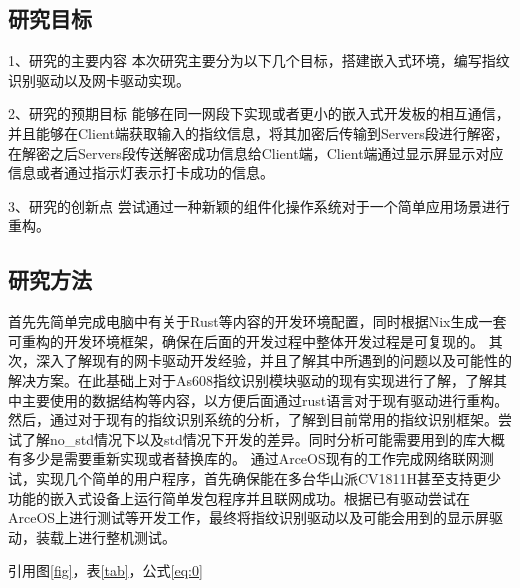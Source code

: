 
\subsection{研究目标}

1、研究的主要内容
本次研究主要分为以下几个目标，搭建嵌入式环境，编写指纹识别驱动以及网卡驱动实现。

2、研究的预期目标
能够在同一网段下实现或者更小的嵌入式开发板的相互通信，并且能够在Client端获取输入的指纹信息，将其加密后传输到Servers段进行解密，在解密之后Servers段传送解密成功信息给Client端，Client端通过显示屏显示对应信息或者通过指示灯表示打卡成功的信息。

3、研究的创新点
    尝试通过一种新颖的组件化操作系统对于一个简单应用场景进行重构。

\subsection{研究方法}

首先先简单完成电脑中有关于Rust等内容的开发环境配置，同时根据Nix生成一套可重构的开发环境框架，确保在后面的开发过程中整体开发过程是可复现的。
其次，深入了解现有的网卡驱动开发经验，并且了解其中所遇到的问题以及可能性的解决方案。在此基础上对于As608指纹识别模块驱动的现有实现进行了解，了解其中主要使用的数据结构等内容，以方便后面通过rust语言对于现有驱动进行重构。
然后，通过对于现有的指纹识别系统的分析，了解到目前常用的指纹识别框架。尝试了解no\_std情况下以及std情况下开发的差异。同时分析可能需要用到的库大概有多少是需要重新实现或者替换库的。
通过ArceOS现有的工作完成网络联网测试，实现几个简单的用户程序，首先确保能在多台华山派CV1811H甚至支持更少功能的嵌入式设备上运行简单发包程序并且联网成功。根据已有驱动尝试在ArceOS上进行测试等开发工作，最终将指纹识别驱动以及可能会用到的显示屏驱动，装载上进行整机测试。

引用图\ref{fig}，表\ref{tab}，公式\eqref{eq:0}
